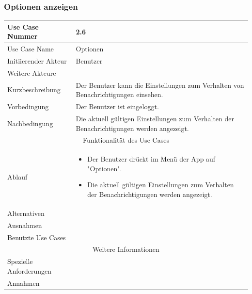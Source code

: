 \documentclass[10pt,a4paper]{article}
\begin{document}
\subsubsection{Optionen anzeigen}
	\begin{tabular}{|l|p{.5\linewidth}|}
	\hline Use Case Nummer & 2.6 \\ 
	\hline Use Case Name & Optionen \\ 
	\hline Initiierender Akteur & Benutzer \\
	\hline Weitere Akteure &  \\
	\hline Kurzbeschreibung & Der Benutzer kann die Einstellungen zum Verhalten von Benachrichtigungen einsehen. \\
	\hline Vorbedingung & Der Benutzer ist eingeloggt. \\
	\hline Nachbedingung & Die aktuell gültigen Einstellungen zum Verhalten der Benachrichtigungen werden angezeigt. \\
	\hline \multicolumn{2}{|c|}{Funktionalität des Use Cases}\\
	\hline Ablauf & \begin{itemize}
		\item Der Benutzer drückt im Menü der App auf "Optionen".
		\item Die aktuell gültigen Einstellungen zum Verhalten der Benachrichtigungen werden angezeigt.
	\end{itemize} \\
	\hline Alternativen &  \\
	\hline Ausnahmen &  \\
	\hline Benutzte Use Cases &  \\
	\hline \multicolumn{2}{|c|}{Weitere Informationen} \\
	\hline Spezielle Anforderungen &  \\
	\hline Annahmen &  \\
	\hline
	\end{tabular}
\end{document}
